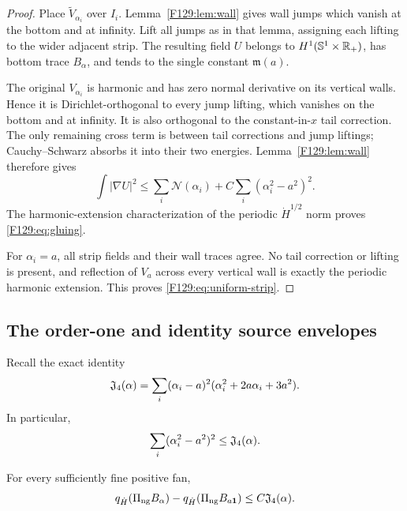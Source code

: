 \begin{proof}
Place \(\widetilde V_{\alpha_i}\) over \(I_i\).  Lemma~\ref{F129:lem:wall}
gives wall jumps which vanish at the bottom and at infinity.  Lift all
jumps as in that lemma, assigning each lifting to the wider adjacent strip.
The resulting field \(U\) belongs to
\(H^1(\mathbb S^1\times\mathbb R_+)\), has bottom trace \(B_\alpha\), and tends
to the single constant \(\mathfrak m(a)\).

The original \(V_{\alpha_i}\) is harmonic and has zero normal derivative
on its vertical walls.  Hence it is Dirichlet-orthogonal to every jump
lifting, which vanishes on the bottom and at infinity.  It is also
orthogonal to the constant-in-\(x\) tail correction.  The only remaining
cross term is between tail corrections and jump liftings; Cauchy--Schwarz
absorbs it into their two energies.  Lemma~\ref{F129:lem:wall} therefore gives
\begin{equation}
 \int|\nabla U|^2
 \le\sum_i\mathcal N(\alpha_i)
 +C\sum_i(\alpha_i^2-a^2)^2.
\end{equation}
The harmonic-extension characterization of the periodic
\(\dot H^{1/2}\) norm proves \eqref{F129:eq:gluing}.

For \(\alpha_i=a\), all strip fields and their wall traces agree.  No tail
correction or lifting is present, and reflection of \(V_a\) across every
vertical wall is exactly the periodic harmonic extension.  This proves
\eqref{F129:eq:uniform-strip}.
\end{proof}

\subsection{The order-one and identity source envelopes}

Recall the exact identity
\begin{equation}\label{F129:eq:Jidentity}
 \mathfrak J_4(\alpha)
 =\sum_i(\alpha_i-a)^2
   (\alpha_i^2+2a\alpha_i+3a^2).
\end{equation}
In particular,
\begin{equation}\label{F129:eq:square-charge}
 \sum_i(\alpha_i^2-a^2)^2
 \le\mathfrak J_4(\alpha).
\end{equation}

\begin{theorem}\label{F129:thm:qdot}
For every sufficiently fine positive fan,
\begin{equation}\label{F129:eq:qdot-envelope}
 q_{\dot H}(\Pi_{\rm ng} B_\alpha)-q_{\dot H}(\Pi_{\rm ng} B_{a\mathbf1})
 \le C\mathfrak J_4(\alpha).
\end{equation}
\end{theorem}

